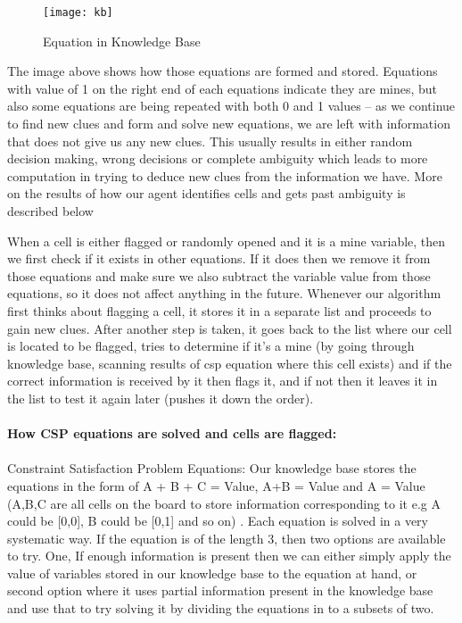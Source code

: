 \documentclass{article}
\begin{document}
\begin{figure}[htp]
    \centering
    \texttt{[image: kb]}
    \caption{Equation in Knowledge Base}
    \label{fig:board}
\end{figure}

The image above shows how those equations are formed and stored. Equations with value of 1 on the right end of each equations indicate they are mines, but also some equations are being repeated with both 0 and 1 values – as we continue to find new clues and form and solve new equations, we are left with information that  does not give us any new clues. 
This usually results in either random decision making, wrong decisions or complete ambiguity which leads to more computation in trying to deduce new clues from the information we have. More on the results of how our agent identifies cells and gets past ambiguity is described below

When a cell is either flagged or randomly opened and it is a mine variable, then we first check if it exists in other equations. If it does then we remove it from those equations and make sure we also subtract the variable value from those equations, so it does not affect anything in the future. Whenever our algorithm first thinks about flagging a cell, it stores it in a separate list and proceeds to gain new clues. After another step is taken, it goes back to the list where our cell is located to be flagged, tries to determine if it’s a mine (by going through knowledge base, scanning results of csp equation where this cell exists) and if the correct information is received by it then flags it, and if not then it leaves it in the list to test it again later (pushes it down the order).
\\ \\ 
\textbf{How CSP equations are solved and cells are flagged:}
\\ \\ 
Constraint Satisfaction Problem Equations: Our knowledge base stores the equations in the form of A + B + C = Value,  A+B = Value and A = Value (A,B,C are all cells on the board to store information corresponding to it e.g A could be [0,0], B could be [0,1] and so on) . Each equation is solved in a very systematic way. If the equation is of the length 3, then two options are available to try. One, If enough information is present then we can either simply apply the value of variables stored in our knowledge base to the equation at hand, or second option where it uses partial information present in the knowledge base and use that to try solving it by dividing the equations in to a subsets of two. 
\end{document}
